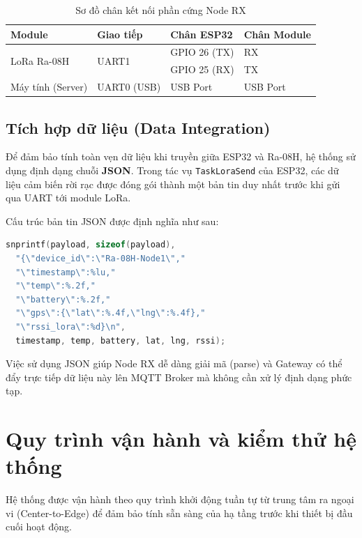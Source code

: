\begin{table}[h]
    \centering
    \begin{tabular}{|p{3cm}|p{2.5cm}|p{3cm}|p{4cm}|}
    \hline
    \textbf{Module} & \textbf{Giao tiếp} & \textbf{Chân ESP32} & \textbf{Chân Module} \\ \hline
    \multirow{2}{*}{LoRa Ra-08H} & \multirow{2}{*}{UART1} & GPIO 26 (TX) & RX \\  
     & & GPIO 25 (RX) & TX \\ \hline
    Máy tính (Server) & UART0 (USB) & USB Port & USB Port \\ \hline
    \end{tabular}
    \caption{Sơ đồ chân kết nối phần cứng Node RX}
    \label{tab:wiring_rx}
\end{table}


\subsection{Tích hợp dữ liệu (Data Integration)}
Để đảm bảo tính toàn vẹn dữ liệu khi truyền giữa ESP32 và Ra-08H, hệ thống sử dụng định dạng chuỗi \textbf{JSON}. Trong tác vụ \texttt{TaskLoraSend} của ESP32, các dữ liệu cảm biến rời rạc được đóng gói thành một bản tin duy nhất trước khi gửi qua UART tới module LoRa.

Cấu trúc bản tin JSON được định nghĩa như sau:
\begin{lstlisting}[language=C, caption={Đoạn code đóng gói JSON trên Node TX}]
snprintf(payload, sizeof(payload),
  "{\"device_id\":\"Ra-08H-Node1\","
  "\"timestamp\":%lu,"
  "\"temp\":%.2f,"
  "\"battery\":%.2f,"
  "\"gps\":{\"lat\":%.4f,\"lng\":%.4f},"
  "\"rssi_lora\":%d}\n",
  timestamp, temp, battery, lat, lng, rssi);
\end{lstlisting}

Việc sử dụng JSON giúp Node RX dễ dàng giải mã (parse) và Gateway có thể đẩy trực tiếp dữ liệu này lên MQTT Broker mà không cần xử lý định dạng phức tạp.
\section{Quy trình vận hành và kiểm thử hệ thống}
Hệ thống được vận hành theo quy trình khởi động tuần tự từ trung tâm ra ngoại vi (Center-to-Edge) để đảm bảo tính sẵn sàng của hạ tầng trước khi thiết bị đầu cuối hoạt động.

